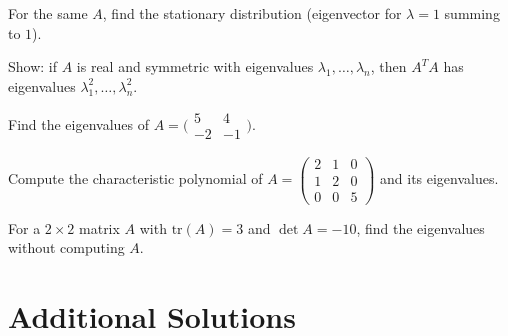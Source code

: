 \begin{problems}
  \item For the same $A$, find the stationary distribution (eigenvector for $\lambda = 1$ summing to $1$).
  \item Show: if $A$ is real and symmetric with eigenvalues $\lambda_{1}, \dots, \lambda_{n}$, then $A^{T} A$ has eigenvalues $\lambda_{1}^{2}, \dots, \lambda_{n}^{2}$.
  \item Find the eigenvalues of $A = \bigl(\begin{smallmatrix} 5 & 4 \\ -2 & -1 \end{smallmatrix}\bigr)$.
  \item Compute the characteristic polynomial of $A = \begin{pmatrix} 2 & 1 & 0 \\ 1 & 2 & 0 \\ 0 & 0 & 5 \end{pmatrix}$ and its eigenvalues.
  \item For a $2 \times 2$ matrix $A$ with $\mathrm{tr}(A) = 3$ and $\det A = -10$, find the eigenvalues without computing $A$.
\end{problems}

\section{Additional Solutions}

